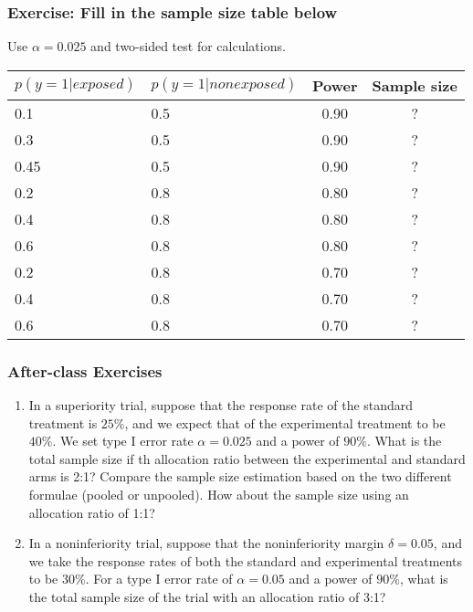 \documentclass[table,10pt]{beamer}
\begin{document}
\begin{CJK*}{UTF8}{gbsn}
\begin{frame}[t]
\frametitle{Exercise: Fill in the sample size table below}
Use $\alpha=0.025$ and two-sided test for calculations.
\begin{table}
\begin{tabular}{llcc}
$p(y=1|exposed)$ & $p(y=1|nonexposed)$ & Power & Sample size\\
\hline
0.1 & 0.5 & 0.90 & ?\\
0.3 & 0.5 & 0.90 & ?\\
0.45 & 0.5 & 0.90 & ?\\
0.2 & 0.8 & 0.80 & ?\\
0.4 & 0.8 & 0.80 & ?\\
0.6 & 0.8 & 0.80 & ?\\
0.2 & 0.8 & 0.70 & ?\\
0.4 & 0.8 & 0.70 & ?\\
0.6 & 0.8 & 0.70 & ?\\
\hline
\end{tabular}
\end{table}
\end{frame}

\begin{frame}[t]
\frametitle{After-class Exercises}
\begin{enumerate}[(1)]
	\item In a superiority trial, suppose that the response rate of 
		the standard treatment is $25\%$, and we expect that of 
		the experimental treatment to be $40\%$. We set type I 
		error rate $\alpha=0.025$ and a power of $90\%$. What is
		the total sample size if th allocation ratio between the
		experimental and standard arms is 2:1? Compare the 
		sample size estimation based on the two different 
		formulae (pooled or unpooled). How about the sample 
		size using an allocation ratio of 1:1?
	\item In a noninferiority trial, suppose that the noninferiority
		margin $\delta=0.05$, and we take the response rates of 
		both the standard and experimental treatments to be 
		$30\%$. For a type I error rate of $\alpha=0.05$ and a 
		power of $90\%$, what is the total sample size of the 
		trial with an allocation ratio of 3:1?  
\end{enumerate}
\end{frame}



\end{CJK*}
\end{document}
